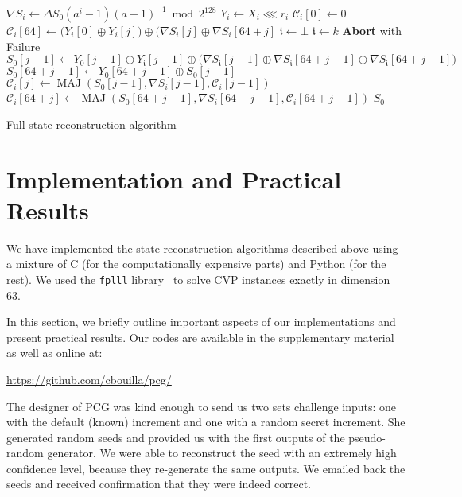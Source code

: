 \documentclass[submission,svgnames,journal=tosc]{iacrtrans}
\DeclareMathOperator{\MAJ}{MAJ}
\begin{document}
\begin{algorithm}
\begin{algorithmic}[1]
   
  \State $\nabla S_i \gets \Delta S_0 (a^i-1)(a-1)^{-1} \bmod 2^{128}$
  \State $Y_i \gets X_i \lll r_i$ 
  \State $\mathcal{C}_i[0] \gets 0$ 
  \State $\mathcal{C}_i[64] \gets \bigl( Y_i[0] \oplus Y_i[j] \bigr) \oplus \bigl( \nabla S_i[j] \oplus \nabla S_i[64+j]$
  \EndFor
   
  \State $\mathfrak{i} \gets \bot$ 
  \State $\mathfrak{i} \gets k$
  \EndIf
  \EndFor
   
  \State \textbf{Abort} with Failure
  \EndIf
  \State  {}
  \State $S_0[j-1] \gets Y_0[j-1] \oplus Y_{\mathfrak{i}}[j-1] \oplus \bigl( \nabla S_{\mathfrak{i}}[j-1] \oplus \nabla S_{\mathfrak{i}}[64+j-1] \oplus \nabla S_{\mathfrak{i}}[64 + j-1]\bigr)$
  \State $S_0[64 + j-1] \gets Y_0[64 + j-1] \oplus S_0[j-1]$
   
  \State $\mathcal{C}_i[j] \gets \MAJ(S_0[j-1], \nabla S_i[j-1], \mathcal{C}_i[j-1])$
  \State $\mathcal{C}_i[64 + j] \gets \MAJ(S_0[64+j-1], \nabla S_i[64+j-1], \mathcal{C}_i[64+j-1])$
  \EndFor
  \EndFor
  \State \Return $S_0$
  \EndFunction
\end{algorithmic}
\caption{Full state reconstruction algorithm}
\label{algo:last}
\end{algorithm}

\section{Implementation and Practical Results}
\label{sec:implem}

We have implemented the state reconstruction algorithms described above using a
mixture of \textsf{C} (for the computationally expensive parts) and
\textsf{Python} (for the rest). We used the \texttt{fplll} library~\cite{fplll}
to solve CVP instances exactly in dimension 63.

In this section, we briefly outline important aspects of our implementations and
present practical results. Our codes are available in the supplementary material
as well as online at:
\begin{center}
  \url{https://github.com/cbouilla/pcg/}
\end{center}
The designer of \textsf{PCG} was kind enough to send us two sets challenge
inputs: one with the default (known) increment and one with a random secret
increment. She generated random seeds and provided us with the first outputs of
the pseudo-random generator. We were able to reconstruct the seed with an
extremely high confidence level, because they re-generate the same outputs. We
emailed back the seeds and received confirmation that they were indeed correct.
\end{document}
